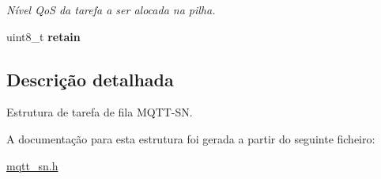 \begin{DoxyCompactItemize}
\begin{DoxyCompactList}\small\item\em Nível Qo\+S da tarefa a ser alocada na pilha. \end{DoxyCompactList}\item 
\hypertarget{structmqtt__sn__task__t_ae25d47ab22bd975ad97012eddb6bbfce}{uint8\+\_\+t {\bfseries retain}}\label{structmqtt__sn__task__t_ae25d47ab22bd975ad97012eddb6bbfce}

\end{DoxyCompactItemize}


\subsection{Descrição detalhada}
Estrutura de tarefa de fila M\+Q\+T\+T-\/\+S\+N. 

A documentação para esta estrutura foi gerada a partir do seguinte ficheiro\+:\begin{DoxyCompactItemize}
\item 
\hyperlink{mqtt__sn_8h}{mqtt\+\_\+sn.\+h}\end{DoxyCompactItemize}
